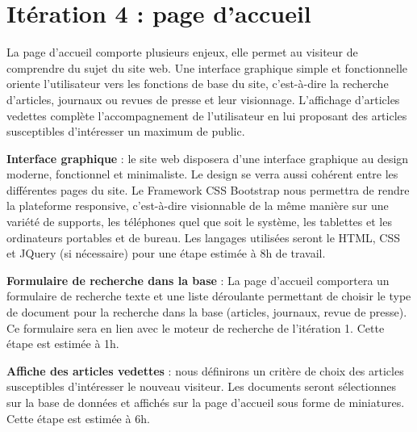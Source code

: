 \section{Itération 4 : page d'accueil}

La page d'accueil comporte plusieurs enjeux, elle permet au visiteur de comprendre du sujet du site web. Une interface graphique simple et fonctionnelle oriente l'utilisateur vers les fonctions de base du site, c'est-à-dire la recherche d'articles, journaux ou revues de presse et leur visionnage. L'affichage d'articles vedettes complète l'accompagnement de l'utilisateur en lui proposant des articles susceptibles d'intéresser un maximum de public.

\textbf{Interface graphique} : le site web disposera d'une interface graphique au design moderne, fonctionnel et minimaliste. Le design se verra aussi cohérent entre les différentes pages du site. Le Framework CSS Bootstrap nous permettra de rendre la plateforme responsive, c'est-à-dire visionnable de la même manière sur une variété de supports, les téléphones quel que soit le système, les tablettes et les ordinateurs portables et de bureau. Les langages utilisées seront le HTML, CSS et JQuery (si nécessaire) pour une étape estimée à 8h de travail.

\textbf{Formulaire de recherche dans la base} : La page d’accueil comportera un formulaire de recherche texte et une liste déroulante permettant de choisir le type de document pour la recherche dans la base (articles, journaux, revue de presse). Ce formulaire sera en lien avec le moteur de recherche de l'itération 1. Cette étape est estimée à 1h.

\textbf{Affiche des articles vedettes} : nous définirons un critère de choix des articles susceptibles d'intéresser le nouveau visiteur. Les documents seront sélectionnes sur la base de données et affichés sur la page d'accueil sous forme de miniatures. Cette étape est estimée à 6h.